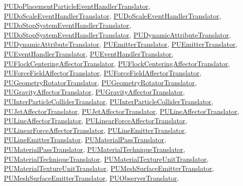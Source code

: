 \hyperlink{classPUDoPlacementParticleEventHandlerTranslator}{P\+U\+Do\+Placement\+Particle\+Event\+Handler\+Translator}, \hyperlink{classPUDoScaleEventHandlerTranslator}{P\+U\+Do\+Scale\+Event\+Handler\+Translator}, \hyperlink{classPUDoScaleEventHandlerTranslator}{P\+U\+Do\+Scale\+Event\+Handler\+Translator}, \hyperlink{classPUDoStopSystemEventHandlerTranslator}{P\+U\+Do\+Stop\+System\+Event\+Handler\+Translator}, \hyperlink{classPUDoStopSystemEventHandlerTranslator}{P\+U\+Do\+Stop\+System\+Event\+Handler\+Translator}, \hyperlink{classPUDynamicAttributeTranslator}{P\+U\+Dynamic\+Attribute\+Translator}, \hyperlink{classPUDynamicAttributeTranslator}{P\+U\+Dynamic\+Attribute\+Translator}, \hyperlink{classPUEmitterTranslator}{P\+U\+Emitter\+Translator}, \hyperlink{classPUEmitterTranslator}{P\+U\+Emitter\+Translator}, \hyperlink{classPUEventHandlerTranslator}{P\+U\+Event\+Handler\+Translator}, \hyperlink{classPUEventHandlerTranslator}{P\+U\+Event\+Handler\+Translator}, \hyperlink{classPUFlockCenteringAffectorTranslator}{P\+U\+Flock\+Centering\+Affector\+Translator}, \hyperlink{classPUFlockCenteringAffectorTranslator}{P\+U\+Flock\+Centering\+Affector\+Translator}, \hyperlink{classPUForceFieldAffectorTranslator}{P\+U\+Force\+Field\+Affector\+Translator}, \hyperlink{classPUForceFieldAffectorTranslator}{P\+U\+Force\+Field\+Affector\+Translator}, \hyperlink{classPUGeometryRotatorTranslator}{P\+U\+Geometry\+Rotator\+Translator}, \hyperlink{classPUGeometryRotatorTranslator}{P\+U\+Geometry\+Rotator\+Translator}, \hyperlink{classPUGravityAffectorTranslator}{P\+U\+Gravity\+Affector\+Translator}, \hyperlink{classPUGravityAffectorTranslator}{P\+U\+Gravity\+Affector\+Translator}, \hyperlink{classPUInterParticleColliderTranslator}{P\+U\+Inter\+Particle\+Collider\+Translator}, \hyperlink{classPUInterParticleColliderTranslator}{P\+U\+Inter\+Particle\+Collider\+Translator}, \hyperlink{classPUJetAffectorTranslator}{P\+U\+Jet\+Affector\+Translator}, \hyperlink{classPUJetAffectorTranslator}{P\+U\+Jet\+Affector\+Translator}, \hyperlink{classPULineAffectorTranslator}{P\+U\+Line\+Affector\+Translator}, \hyperlink{classPULineAffectorTranslator}{P\+U\+Line\+Affector\+Translator}, \hyperlink{classPULinearForceAffectorTranslator}{P\+U\+Linear\+Force\+Affector\+Translator}, \hyperlink{classPULinearForceAffectorTranslator}{P\+U\+Linear\+Force\+Affector\+Translator}, \hyperlink{classPULineEmitterTranslator}{P\+U\+Line\+Emitter\+Translator}, \hyperlink{classPULineEmitterTranslator}{P\+U\+Line\+Emitter\+Translator}, \hyperlink{classPUMaterialPassTranslator}{P\+U\+Material\+Pass\+Translator}, \hyperlink{classPUMaterialPassTranslator}{P\+U\+Material\+Pass\+Translator}, \hyperlink{classPUMaterialTechniqueTranslator}{P\+U\+Material\+Technique\+Translator}, \hyperlink{classPUMaterialTechniqueTranslator}{P\+U\+Material\+Technique\+Translator}, \hyperlink{classPUMaterialTextureUnitTranslator}{P\+U\+Material\+Texture\+Unit\+Translator}, \hyperlink{classPUMaterialTextureUnitTranslator}{P\+U\+Material\+Texture\+Unit\+Translator}, \hyperlink{classPUMeshSurfaceEmitterTranslator}{P\+U\+Mesh\+Surface\+Emitter\+Translator}, \hyperlink{classPUMeshSurfaceEmitterTranslator}{P\+U\+Mesh\+Surface\+Emitter\+Translator}, \hyperlink{classPUObserverTranslator}{P\+U\+Observer\+Translator}, 